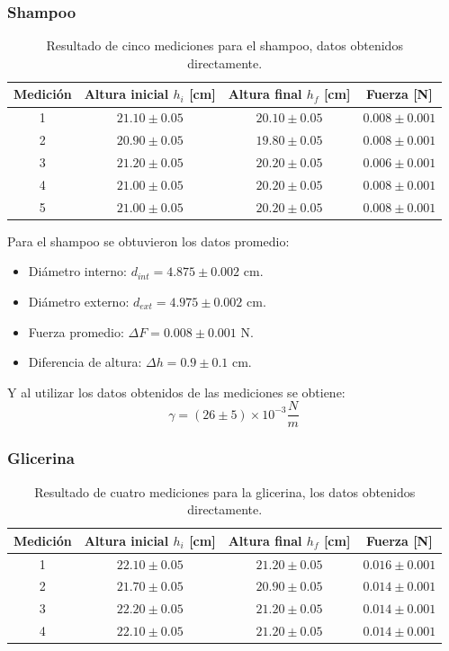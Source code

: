 \documentclass[a4paper]{article}
\begin{document}
\subsubsection*{Shampoo}
\begin{table}[H]
  \centering
    \begin{tabular}{|c|c|c|c|} \hline
    Medición & Altura inicial $h_i$ [cm] & Altura final $h_f$ [cm] & Fuerza [N] \\ \hline
    1     & $21.10\pm0.05$ & $20.10\pm0.05$ & $0.008\pm0.001$ \\ \hline
    2     & $20.90\pm0.05$ & $19.80\pm0.05$ & $0.008\pm0.001$ \\ \hline
    3     & $21.20\pm0.05$ & $20.20\pm0.05$ & $0.006\pm0.001$ \\ \hline
    4     & $21.00\pm0.05$ & $20.20\pm0.05$ & $0.008\pm0.001$ \\ \hline
    5     & $21.00\pm0.05$ & $20.20\pm0.05$ & $0.008\pm0.001$ \\ \hline
    \end{tabular}%
  \caption{Resultado de cinco mediciones para el shampoo, datos obtenidos directamente.}
\end{table}%

Para el shampoo se obtuvieron los datos promedio:
\begin{itemize}
    \item Diámetro interno: $d_{int} = 4.875\pm0.002$ cm.
    \item Diámetro externo: $d_{ext} = 4.975\pm0.002$ cm.
    \item Fuerza promedio: $\Delta F = 0.008\pm0.001$ N.
    \item Diferencia de altura: $\Delta h = 0.9\pm 0.1$ cm.
\end{itemize}

Y al utilizar los datos obtenidos de las mediciones se obtiene:
$$\gamma = (26\pm 5)\times10^{-3}  \frac{N}{m}$$

\subsubsection*{Glicerina}
\begin{table}[H]
  \centering
    \begin{tabular}{|c|c|c|c|} \hline
    Medición & Altura inicial $h_i$ [cm] & Altura final $h_f$ [cm] & Fuerza [N] \\ \hline
    1     & $22.10\pm0.05$ & $21.20\pm0.05$ & $0.016\pm0.001$ \\ \hline
    2     & $21.70\pm0.05$ & $20.90\pm0.05$ & $0.014\pm0.001$ \\ \hline
    3     & $22.20\pm0.05$ & $21.20\pm0.05$ & $0.014\pm0.001$ \\ \hline
    4     & $22.10\pm0.05$ & $21.20\pm0.05$ & $0.014\pm0.001$ \\ \hline
    \end{tabular}%
  \caption{Resultado de cuatro mediciones para la glicerina, los datos obtenidos directamente.}
\end{table}%
\end{document}
